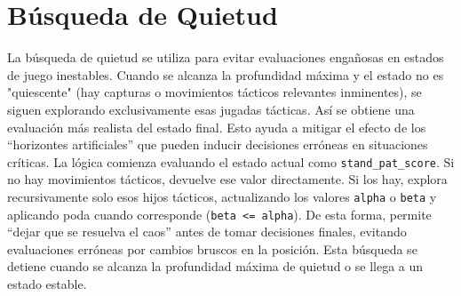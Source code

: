 \section*{Búsqueda de Quietud}
La búsqueda de quietud se utiliza para evitar evaluaciones engañosas en estados de juego inestables. Cuando se alcanza la profundidad máxima y el estado no es "quiescente" (hay capturas o movimientos tácticos relevantes inminentes), se siguen explorando exclusivamente esas jugadas tácticas. Así se obtiene una evaluación más realista del estado final. Esto ayuda a mitigar el efecto de los ``horizontes artificiales'' que pueden inducir decisiones erróneas en situaciones críticas.
La lógica comienza evaluando el estado actual como \texttt{stand\_pat\_score}. Si no hay movimientos tácticos, devuelve ese valor directamente. Si los hay, explora recursivamente solo esos hijos tácticos, actualizando los valores \texttt{alpha} o \texttt{beta} y aplicando poda cuando corresponde (\texttt{beta <= alpha}). De esta forma, permite “dejar que se resuelva el caos” antes de tomar decisiones finales, evitando evaluaciones erróneas por cambios bruscos en la posición. Esta búsqueda se detiene cuando se alcanza la profundidad máxima de quietud o se llega a un estado estable.

